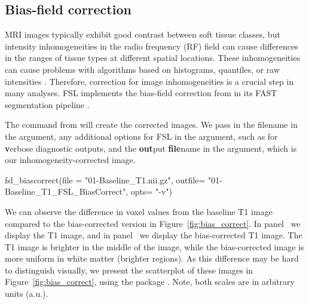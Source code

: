 \subsection{Bias-field correction}

MRI images typically exhibit good contrast between soft tissue classes, but intensity inhomogeneities in the radio frequency (RF) field can cause differences in the ranges of tissue types at different spatial locations.  These inhomogeneities can cause problems with algorithms based on histograms, quantiles, or raw intensities \citep{zhang_segmentation_2001}.  Therefore, correction for image inhomogeneities is a crucial step in many analyses.  FSL implements the bias-field correction from \citet{guillemaud_estimating_1997} in its FAST segmentation pipeline \citep{zhang_segmentation_2001}.  
 






The  command from  will create the corrected images.  We pass in the filename in the  argument, any additional options for FSL in the  argument, such as  for {\bf v}erbose diagnostic outputs, and the {\bf out}put {\bf file}name in the  argument, which is our inhomogeneity-corrected image.



\begin{Schunk}
\begin{Sinput}
fsl_biascorrect(file = "01-Baseline_T1.nii.gz", 
                outfile= "01-Baseline_T1_FSL_BiasCorrect",
                opts= "-v")
\end{Sinput}
\end{Schunk}




We can observe the difference in voxel values from the baseline T1 image compared to the bias-corrected version in Figure~\ref{fig:bias_correct}.  In panel~\protect{} we display the T1 image, and in panel~\protect{} we display the bias-corrected T1 image.  The T1 image is brighter in the middle of the image, while the bias-corrected image is more uniform in white matter (brighter regions).  As this difference may be hard to distinguish visually, we present the scatterplot of these images in Figure~\ref{fig:bias_correct}\protect{}, using the  package \citep{wickham_ggplot2:_2009}.  Note, both scales are in arbitrary units (a.u.).


